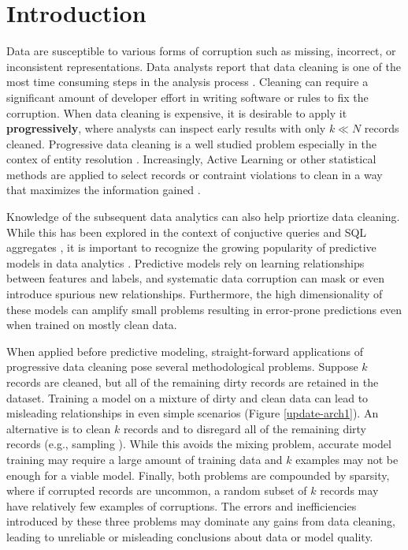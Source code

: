 \section{Introduction}
Data are susceptible to various forms of corruption such as missing, incorrect, or inconsistent representations.
Data analysts report that data cleaning is one of the most time consuming steps in the analysis process \cite{nytimes}.
Cleaning can require a significant amount of developer effort in writing software or rules to fix the corruption.
When data cleaning is expensive, it is desirable to apply it \textbf{progressively}, where analysts can inspect early results with only $k \ll N$ records cleaned.
Progressive data cleaning is a well studied problem especially in the contex of entity resolution \cite{whang2014incremental, papenbrock2015progressive, gruenheid2014incremental}.
Increasingly, Active Learning \cite{settles2010active} or other statistical methods are applied to select records or contraint violations to clean in a way that maximizes the information gained \cite{DBLP:journals/pvldb/YakoutENOI11, gokhale2014corleone, yakout2013don}.

Knowledge of the subsequent data analytics can also help priortize data cleaning.
While this has been explored in the context of conjuctive queries \cite{DBLP:conf/sigmod/BergmanMNT15} and SQL aggregates \cite{wang1999sample}, it is important to recognize the growing popularity of predictive models in data analytics \cite{bdas, alexandrov2014stratosphere, crotty2014tupleware, hellerstein2012madlib}.
Predictive models rely on learning relationships between features and labels, and systematic data corruption \cite{taylor1982introduction} can mask or even introduce spurious new relationships.
Furthermore, the high dimensionality of these models can amplify small problems \cite{xiaofeature} resulting in error-prone predictions even when trained on mostly clean data.

When applied before predictive modeling, straight-forward applications of progressive data cleaning pose several methodological problems.
Suppose $k$ records are cleaned, but all of the remaining dirty records are retained in the dataset.
Training a model on a mixture of dirty and clean data can lead to misleading relationships in even simple scenarios (Figure \ref{update-arch1}).
An alternative is to clean $k$ records and to disregard all of the remaining dirty records (e.g., sampling \cite{wang1999sample}).
While this avoids the mixing problem, accurate model training may require a large amount of training data and $k$ examples may not be enough for a viable model.
Finally, both problems are compounded by sparsity, where if corrupted records are uncommon, a random subset of $k$ records may have relatively few examples of corruptions.
The errors and inefficiencies introduced by these three problems may dominate any gains from data cleaning, leading to unreliable or misleading conclusions about data or model quality.

